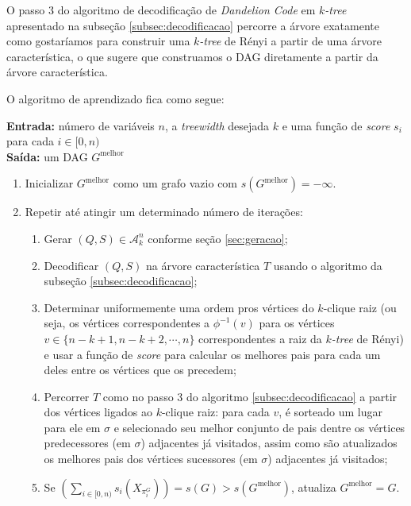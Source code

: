 O passo 3 do algoritmo de decodificação de \emph{Dandelion Code} em \emph{$k$-tree} apresentado na subseção \ref{subsec:decodificacao} percorre a árvore exatamente como gostaríamos para construir uma \emph{$k$-tree} de Rényi a partir de uma árvore característica, o que sugere que construamos o DAG diretamente a partir da árvore característica.

O algoritmo de aprendizado fica como segue:

\begin{algorithm}
  \textbf{Entrada:} número de variáveis $n$, a \emph{treewidth} desejada $k$ e uma função de \emph{score} $s_i$ para cada $i \in [0, n)$\\
  \textbf{Saída:} um DAG $G^{\text{melhor}}$

  \begin{enumerate}
    \item Inicializar $G^{\text{melhor}}$ como um grafo vazio com $s(G^{\text{melhor}}) = -\infty$.
    \item Repetir até atingir um determinado número de iterações:
      \begin{enumerate}
        \item Gerar $(Q, S) \in \mathcal{A}^n_k$ conforme seção \ref{sec:geracao};
        \item Decodificar $(Q, S)$ na árvore característica $T$ usando o algoritmo da subseção \ref{subsec:decodificacao};
        \item Determinar uniformemente uma ordem pros vértices do $k$-clique raiz (ou seja, os vértices correspondentes a $\phi^{-1}(v)$ para os vértices $v \in \{n-k+1, n-k+2, \cdots, n\}$ correspondentes a raiz da \emph{$k$-tree} de Rényi) e usar a função de \emph{score} para calcular os melhores pais para cada um deles entre os vértices que os precedem;
        \item Percorrer $T$ como no passo 3 do algoritmo \ref{subsec:decodificacao} a partir dos vértices ligados ao $k$-clique raiz: para cada $v$, é sorteado um lugar para ele em $\sigma$ e selecionado seu melhor conjunto de pais dentre os vértices predecessores (em $\sigma$) adjacentes já visitados, assim como são atualizados os melhores pais dos vértices sucessores (em $\sigma$) adjacentes já visitados;
        \item Se $\left(\sum_{i \in [0,n)} s_i(X_{\pi^G_{i}})\right) = s(G) > s(G^{\text{melhor}})$, atualiza $G^{\text{melhor}} = G$.
      \end{enumerate}
  \end{enumerate}
\end{algorithm}

